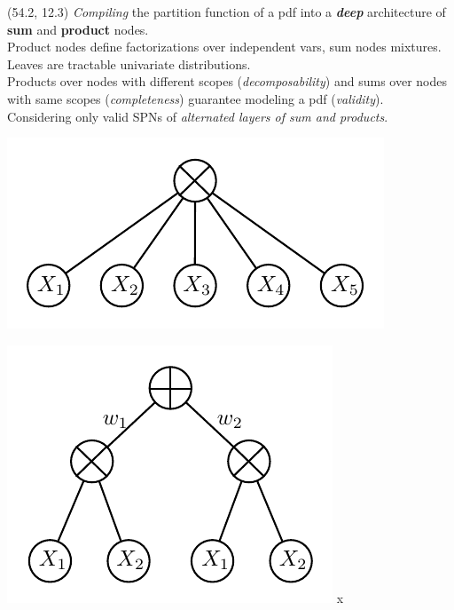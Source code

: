 \documentclass[final]{beamer}
\begin{document}
\begin{frame}{}
\begin{textblock}{25.7}
    
  \end{textblock}

  
  \begin{textblock}{25.7}(54.2, 12.3)
    \small
    \emph{Compiling} the partition function of a pdf into a \textbf{\emph{deep}} architecture of \textbf{sum}
    and \textbf{product} nodes.\\
    
    Product nodes define factorizations over independent vars, sum
    nodes mixtures. Leaves are tractable univariate distributions.\\
    
    
    Products over nodes with different scopes (\emph{decomposability}) and
    sums over nodes with same scopes (\emph{completeness}) guarantee modeling
    a pdf (\emph{validity}).\\
    
    Considering only valid SPNs of \emph{alternated layers of sum and
      products}.
    
    \begin{minipage}{0.45\linewidth}
      \centering
      \includegraphics[width=0.8\linewidth]{figures/spn-prod}
    \end{minipage}\begin{minipage}{0.45\linewidth}
      \centering
      \includegraphics[width=0.7\linewidth]{figures/spn-sum}
x    \end{minipage}



\end{textblock}
\end{frame}
\end{document}
